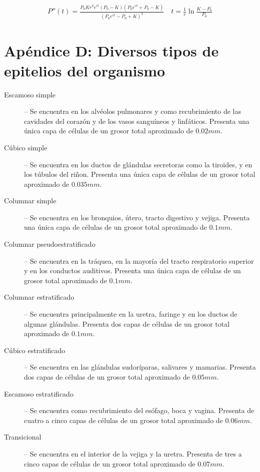 \begin{align*}
\boxed{P''(t) = \displaystyle\frac{P_0 K r^2 e^{rt} (P_0-K)(P_0 e^{rt} + P_0 - K)}{(P_0 e^{rt} - P_0 + K)^3}} \quad \boxed{t = \displaystyle\frac{1}{r} \ln \displaystyle\frac{K-P_0}{P_0}}
\end{align*}

\section{Ap\'endice D: Diversos tipos de epitelios del organismo}
\label{app-d}

\begin{description}
\item [Escamoso simple] -- Se encuentra en los alv\'eolos pulmonares y como recubrimiento de las cavidades del coraz\'on y de los vasos sangu\'ineos y linf\'aticos. Presenta una \'unica capa de c\'elulas de un grosor total aproximado de $0$.$02mm$.

\item [C\'ubico simple] -- Se encuentra en los ductos de gl\'andulas secretoras como la tiroides, y en los t\'ubulos del ri\~non. Presenta una \'unica capa de c\'elulas de un grosor total aproximado de $0$.$035mm$.

\item [Columnar simple] -- Se encuentra en los bronquios, \'utero, tracto digestivo y vejiga. Presenta una \'unica capa de c\'elulas de un grosor total aproximado de $0$.$1mm$.

\item [Columnar pseudoestratificado] -- Se encuentra en la tr\'aquea, en la mayor\'ia del tracto respiratorio superior y en los conductos auditivos. Presenta una \'unica capa de c\'elulas de un grosor total aproximado de $0$.$1mm$.

\item [Columnar estratificado] -- Se encuentra principalmente en la uretra, faringe y en los ductos de algunas gl\'andulas. Presenta dos capas de c\'elulas de un grosor total aproximado de $0$.$1mm$.

\item [C\'ubico estratificado] -- Se encuentra en las gl\'andulas sudor\'iparas, salivares y mamarias. Presenta dos capas de c\'elulas de un grosor total aproximado de $0$.$05mm$.

\item [Escamoso estratificado] -- Se encuentra como recubrimiento del es\'ofago, boca y vagina. Presenta de cuatro a cinco capas de c\'elulas de un grosor total aproximado de $0$.$06mm$.

\item [Transicional] -- Se encuentra en el interior de la vejiga y la uretra. Presenta de tres a cinco capas de c\'elulas de un grosor total aproximado de $0$.$07mm$.
\end{description}

